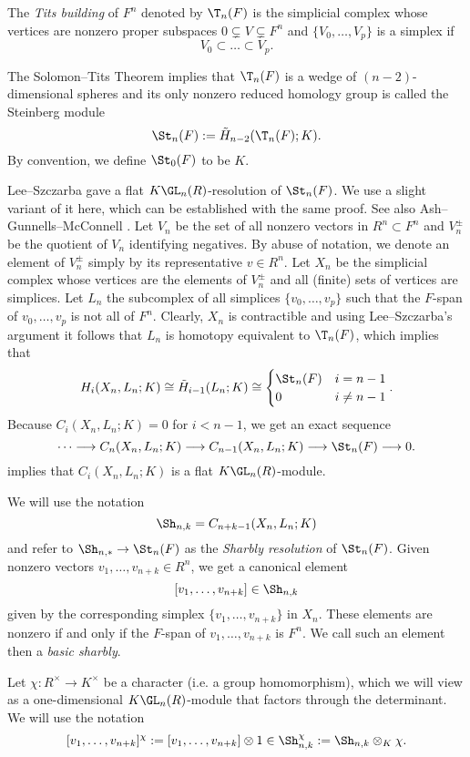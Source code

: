 The \emph{Tits building} of $F^n$ denoted by $\T_n(F)$ is the simplicial complex whose vertices are nonzero proper subspaces $0 \subsetneq V \subsetneq F^n$ and $\{V_0, \dots, V_p\}$ is a simplex if
\[ V_0 \subset \dots \subset V_p.\]

The Solomon--Tits Theorem \cite{Solomon} implies that $\T_n(F)$ is a wedge of $(n-2)$-dimensional spheres and its only nonzero reduced homology group is called the Steinberg module
\[ \St_n(F) := \tilde H_{n-2}(\T_n(F); K).\]
By convention, we define $\St_0(F)$ to be $K$.

Lee--Szczarba \cite{LS} gave a flat $K\GL_n(R)$-resolution of $\St_n(F)$. We use a slight variant of it here, which can be established with the same proof. See also Ash--Gunnells--McConnell \cite{AGM12}. Let $V_n$ be the set of all nonzero vectors in $R^n\subset F^n$ and $V^\pm_n$ be the quotient of $V_n$ identifying negatives. By abuse of notation, we denote an element of $V^\pm_n$ simply by its representative $v\in R^n$. Let $X_n$ be the simplicial complex whose vertices are the elements of $V^\pm_n$ and all (finite) sets of vertices are simplices. Let $L_n$ the subcomplex of all simplices $\{v_0,\dots, v_p\}$ such that the $F$-span of $v_0, \dots, v_p$ is not all of $F^n$. Clearly, $X_n$ is contractible and using Lee--Szczarba's argument it follows that $L_n$ is homotopy equivalent to $\T_n(F)$, which implies that
\[ H_i(X_n,L_n;K) \cong \tilde H_{i-1}(L_n; K) \cong \begin{cases} \St_n(F) & i = n-1\\ 0 &i \neq n-1\end{cases}.\]
Because $C_i(X_n,L_n;K) = 0$ for $i< n-1$, we get an exact sequence
\[ \dots \longrightarrow C_n(X_n,L_n;K) \longrightarrow C_{n-1}(X_n,L_n;K) \longrightarrow \St_n(F) \longrightarrow 0.\]
\cite[Lemma 3.2]{CP} implies that $C_i(X_n,L_n;K)$ is a flat $K\GL_n(R)$-module.

We will use the notation
\[ \Sh_{n,k} = C_{n+k-1}(X_n,L_n;K)\]
and refer to $\Sh_{n,*} \to \St_n(F)$ as the \emph{Sharbly resolution} of $\St_n(F)$. Given nonzero vectors $v_1, \dots, v_{n+k}\in R^n$, we get a canonical element
\[ [v_1, \dots, v_{n+k}] \in \Sh_{n,k}\]
given by the corresponding simplex $\{v_1, \dots, v_{n+k}\}$ in $X_n$. These elements are nonzero if and only if the $F$-span of $v_1, \dots, v_{n+k}$ is  $F^n$. We call such an element then a \emph{basic sharbly}.

Let $\chi\colon R^\times \to K^\times$ be a character (i.e. a group homomorphism), which we will view as a one-dimensional $K\GL_n(R)$-module that factors through the determinant. We will use the notation
\[ [v_1, \dots, v_{n+k}]^\chi := [v_1, \dots, v_{n+k}] \otimes 1 \in \Sh^\chi_{n,k}:= \Sh_{n,k} \otimes_K \chi.\]

